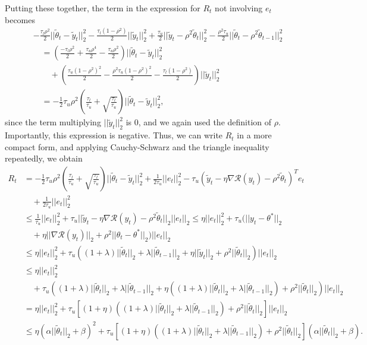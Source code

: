 \documentclass{article}
\begin{document}
Putting these together, the term in the expression for $R_t$ not involving $e_t$ becomes
\begin{align*}
&-\frac{\tau_l\rho^2}{2}||\widetilde{\theta}_t - \widetilde{y}_t||_2^2 - \frac{\tau_l(1 - \rho^2)}{2}||\widetilde{y}_t||_2^2 + \frac{\tau_u}{2}||\widetilde{y}_t - \rho^2\widetilde{\theta}_t||_2^2 - \frac{\rho^2\tau_u}{2}||\widetilde{\theta}_t - \rho^2\widetilde{\theta}_{t - 1}||_2^2 \\
%
& \quad = \left(\frac{-\tau_l\rho^2}{2} + \frac{\tau_u\rho^4}{2} - \frac{\tau_u\rho^2}{2}\right)||\widetilde{\theta}_t - \widetilde{y}_t||_2^2\\
& \qquad +\left(\frac{\tau_u(1 - \rho^2)^2}{2} - \frac{\rho^2\tau_u(1 - \rho^2)^2}{2} - \frac{\tau_l(1 - \rho^2)}{2}\right)||\widetilde{y}_t||_2^2 \\
%
& \quad = -\frac{1}{2}\tau_u\rho^2\left(\frac{\tau_l}{\tau_u} + \sqrt{\frac{\tau_l}{\tau_u}}\right)||\widetilde{\theta}_t - \widetilde{y}_t||_2^2,
\end{align*}
since the term multiplying $||\widetilde{y}_t||_2^2$ is $0$, and we again used the definition of $\rho$. Importantly, this expression is negative. Thus, we can write $R_t$ in a more compact form, and applying Cauchy-Schwarz and the triangle inequality repeatedly, we obtain
\begin{align*}
R_t &= -\frac{1}{2}\tau_u\rho^2\left(\frac{\tau_l}{\tau_u} + \sqrt{\frac{\tau_l}{\tau_u}}\right)||\widetilde{\theta}_t - \widetilde{y}_t||_2^2 + \frac{1}{2\tau_u}||e_t||_2^2 - \tau_u(\widetilde{y}_t - \eta\nabla\mathcal{R}(y_t) -\rho^2\widetilde{\theta}_t)^Te_t\\
& \quad + \frac{1}{2\tau_u}||e_t||_2^2\\
&\leq \frac{1}{\tau_u}||e_t||_2^2 + \tau_u||\widetilde{y}_t - \eta\nabla\mathcal{R}(y_t) -\rho^2\widetilde{\theta}_t||_2||e_t||_2 \leq \eta||e_t||_2^2 + \tau_u(||y_t - \theta^*||_2\\
& \quad + \eta||\nabla\mathcal{R}(y_t)||_2 + \rho^2||\theta_t - \theta^*||_2)||e_t||_2\\
&\leq \eta||e_t||_2^2 + \tau_u((1 + \lambda)||\widetilde{\theta}_t||_2 + \lambda||\widetilde{\theta}_{t - 1}||_2 + \eta||\widetilde{y}_t||_2 + \rho^2||\widetilde{\theta}_t||_2)||e_t||_2\\
&\leq \eta||e_t||_2^2\\
& \quad + \tau_u((1 + \lambda)||\widetilde{\theta}_t||_2 + \lambda||\widetilde{\theta}_{t - 1}||_2 + \eta((1 + \lambda)||\widetilde{\theta}_t||_2 + \lambda||\widetilde{\theta}_{t - 1}||_2) + \rho^2||\widetilde{\theta}_t||_2)||e_t||_2\\
&= \eta||e_t||_2^2 + \tau_u\left[(1 + \eta)((1 + \lambda)||\widetilde{\theta}_t||_2 + \lambda||\widetilde{\theta}_{t - 1}||_2) + \rho^2||\widetilde{\theta}_t||_2\right]||e_t||_2\\
&\leq \eta\left(\alpha||\widetilde{\theta}_t||_2 + \beta\right)^2 + \tau_u\left[(1 + \eta)((1 + \lambda)||\widetilde{\theta}_t||_2 + \lambda||\widetilde{\theta}_{t - 1}||_2) + \rho^2||\widetilde{\theta}_t||_2\right](\alpha||\widetilde{\theta}_t||_2 + \beta).
\end{align*}
\end{document}
